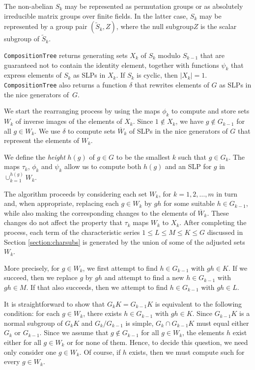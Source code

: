 \documentclass[12pt,twoside,reqno,psamsfonts]{amsproc}
\newcommand{\nullsubgp}{{null subgroup}\xspace}
\numberwithin{equation}{section}
\numberwithin{figure}{section}
\newcounter{algorithm}
\theoremstyle{plain}
\theoremstyle{definition}
\theoremstyle{remark}
\begin{document}
The non-abelian $S_k$ may be represented as permutation groups
or as absolutely irreducible matrix groups over finite fields.
In the latter case, $S_k$ may be represented by a group pair $(\tilde{S}_k,Z)$,
where the \nullsubgp $Z$ is the scalar subgroup of $\tilde{S}_k$. 

{\tt CompositionTree} returns generating sets $X_k$ of $S_k$ 
modulo $S_{k-1}$ that are
guaranteed not to contain the identity element, together with functions
$\psi_k$ that express elements of $S_k$ as SLPs in $X_k$.
If $S_k$ is cyclic, then $|X_k|=1$.
{\tt CompositionTree} also returns a function $\delta$ that 
rewrites elements of $G$ as SLPs in the nice generators of~$G$.

We start the rearranging process by using the maps $\phi_k$ to
compute and store sets $W_k$ of inverse images of the elements of $X_k$.
Since $1 \not\in X_k$, we have $g \not\in G_{k-1}$ for all $g \in W_k$.
We use $\delta$ to compute sets $\overline{W}_k$ of SLPs in the
nice generators of $G$ that represent the elements of $W_k$.

We define the {\it height} $h(g)$ of $g \in G$ to be the smallest $k$ such
that $g \in G_k$.  The maps $\tau_k$, $\phi_k$ and $\psi_k$ allow us to compute
both $h(g)$ and an SLP for $g$ in $\cup_{k=1}^{h(g)} W_k$.

The algorithm proceeds by considering each set $W_k$, for
$k=1,2,\ldots,m$ in turn and, when appropriate, replacing each
$g \in W_k$ by $gh$ for some suitable $h \in G_{k-1}$, while also making
the corresponding changes to the elements of $\overline{W}_k$. These
changes do not affect the property that $\tau_k$ maps $W_k$ to $X_k$.
After completing the process, 
each term of the characteristic series $1 \leqslant L \leqslant M \leqslant  K \leqslant G$
discussed in Section \ref{section:charsubs}
is generated by the union of some of the adjusted sets $W_k$.

More precisely, for $g \in W_k$, we first attempt to find $h \in G_{k-1}$
with $gh \in K$. If we succeed, then we replace $g$ by $gh$ and
attempt to find a new $h \in G_{k-1}$ with $gh \in M$. If that also succeeds,
then we attempt to find $h \in G_{k-1}$ with $gh \in L$.

It is straightforward to show that $G_kK=G_{k-1}K$ is equivalent to the
following condition: for each $g \in W_k$, there exists $h \in G_{k-1}$ with
$gh \in K$.  Since $G_{k-1}K$ is a
normal subgroup of $G_kK$ and $G_k/G_{k-1}$ is simple, $G_k \cap G_{k-1}K$
must equal either $G_k$ or $G_{k-1}$.
Since we assume that $g \not\in G_{k-1}$ for all $g \in W_k$,
the elements $h$ exist either for all $g \in W_k$ or for none of them.
Hence, to decide this question, we need only consider one $g \in W_k$.
Of course, if $h$ exists, then we must compute such
for every $g \in W_k$.
\end{document}
